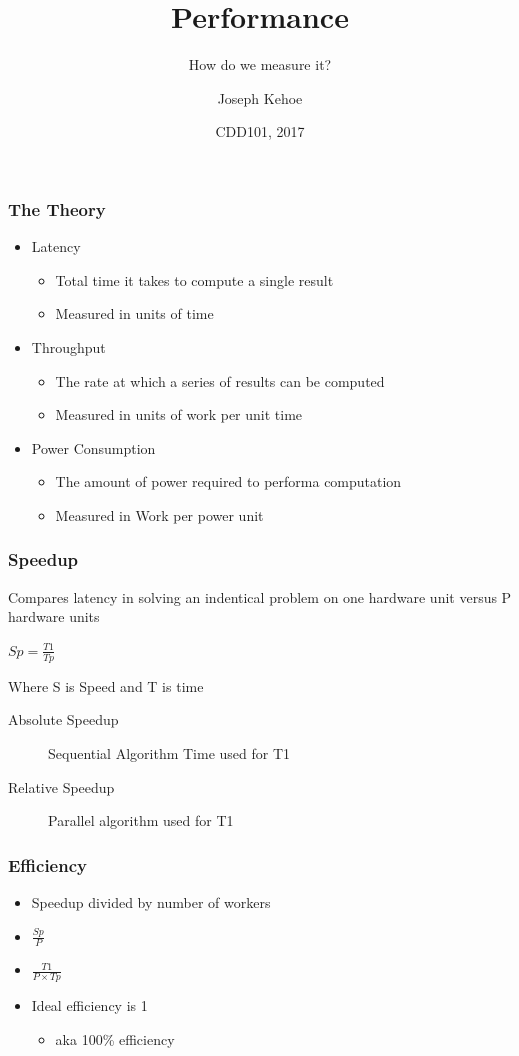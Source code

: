 \documentclass{beamer}
\title[Concurrency] %
{Performance}
\subtitle{How do we measure it?}
\author[Dr. Joseph Kehoe] %
{Joseph Kehoe\inst{1}}
\institute[IT Carlow] %
{
	\inst{1}%
	Department of Computing and Networking\\
	Institute of Technology Carlow
}
\date[ITC 2017] %
{CDD101, 2017}
\begin{document}
 
\frame{\titlepage}
 
 

\begin{frame}[fragile]
\frametitle{The Theory}
\begin{itemize}
\item Latency
	\begin{itemize}
	\item Total time it takes to compute a single result
	\item Measured in units of time
	\end{itemize}
\item Throughput
	\begin{itemize}
	\item The rate at which a series of results can be computed
	\item Measured in units of work per unit time
\end{itemize}
\item Power Consumption
	\begin{itemize}
	\item The amount of power required to performa computation
	\item Measured in Work per power unit
	\end{itemize}
\end{itemize}
\end{frame}


\begin{frame}[fragile]
\frametitle{Speedup}
Compares latency in solving an indentical problem on one hardware unit versus P hardware units

$Sp=\frac{T1}{Tp}$

Where S is Speed and T is time
\begin{description}
\item [Absolute Speedup] Sequential Algorithm Time used for T1
\item [Relative Speedup] Parallel algorithm used for T1 
\end{description}
\end{frame}


\begin{frame}[fragile]
	\frametitle{Efficiency}
\begin{itemize}
\item Speedup divided by number of workers
\item $\frac{Sp}{P}$
\item $\frac{T1}{P\times Tp}$
\item Ideal efficiency is 1
\begin{itemize}
\item aka 100\% efficiency
\end{itemize}


\end{itemize}
\end{frame}
\end{document}
